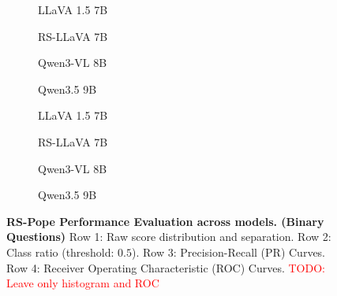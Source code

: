 \begin{figure}[p]
	\vspace{1em}

	\begin{subfigure}[b]{0.240\textwidth}
		\centering
		\resizebox{\linewidth}{!}{%
		}
		\caption{LLaVA 1.5 7B}
	\end{subfigure}\hfill
	\begin{subfigure}[b]{0.240\textwidth}
		\centering
		\resizebox{\linewidth}{!}{%
		}
		\caption{RS-LLaVA 7B}
	\end{subfigure}\hfill
	\begin{subfigure}[b]{0.240\textwidth}
		\centering
		\resizebox{\linewidth}{!}{%
		}
		\caption{Qwen3-VL 8B}
	\end{subfigure}\hfill
	\begin{subfigure}[b]{0.240\textwidth}
		\centering
		\resizebox{\linewidth}{!}{%
		}
		\caption{Qwen3.5 9B}
	\end{subfigure}

	\vspace{1em}

	\begin{subfigure}[b]{0.240\textwidth}
		\centering
		\resizebox{\linewidth}{!}{%
		}
		\caption{LLaVA 1.5 7B}
	\end{subfigure}\hfill
	\begin{subfigure}[b]{0.240\textwidth}
		\centering
		\resizebox{\linewidth}{!}{%
		}
		\caption{RS-LLaVA 7B}
	\end{subfigure}\hfill
	\begin{subfigure}[b]{0.240\textwidth}
		\centering
		\resizebox{\linewidth}{!}{%
		}
		\caption{Qwen3-VL 8B}
	\end{subfigure}\hfill
	\begin{subfigure}[b]{0.240\textwidth}
		\centering
		\resizebox{\linewidth}{!}{%
		}
		\caption{Qwen3.5 9B}
	\end{subfigure}

	\caption{\textbf{RS-Pope Performance Evaluation across models. (Binary Questions)} Row 1: Raw score distribution and separation. Row 2: Class ratio (threshold: $0.5$). Row 3: Precision-Recall (PR) Curves. Row 4: Receiver Operating Characteristic (ROC) Curves. \textcolor{red}{TODO: Leave only histogram and ROC}}
	\label{fig:rspope-all-metrics}
\end{figure}

